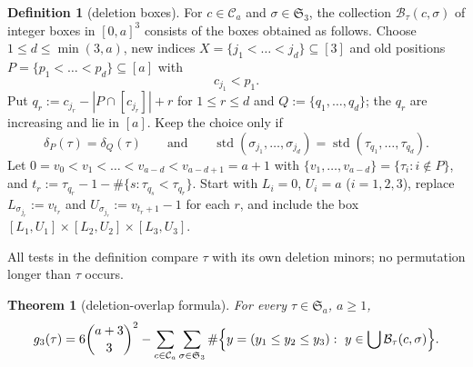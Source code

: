 \documentclass[11pt,reqno]{amsart}
\theoremstyle{plain}
\newtheorem{theorem}{Theorem}[section]
\theoremstyle{definition}
\newtheorem{definition}[definition]{Definition}
\theoremstyle{remark}
\newcommand{\std}{\operatorname{std}}
\newcommand{\Sym}{\mathfrak{S}}
\begin{document}
\begin{definition}[deletion boxes]\label{def:boxes}
For $c\in\mathcal C_a$ and $\sigma\in\Sym_3$, the collection $\mathcal B_\tau(c,\sigma)$ of integer boxes in $[0,a]^3$ consists of the boxes obtained as follows. Choose $1\le d\le\min(3,a)$, new indices $X=\{j_1<\dots<j_d\}\subseteq[3]$ and old positions $P=\{p_1<\dots<p_d\}\subseteq[a]$ with
\begin{equation}\label{eq:earlier}
c_{j_1}<p_1 .
\end{equation}
Put $q_r:=c_{j_r}-|P\cap[c_{j_r}]|+r$ for $1\le r\le d$ and $Q:=\{q_1,\dots,q_d\}$; the $q_r$ are increasing and lie in $[a]$. Keep the choice only if
\begin{equation}\label{eq:keep}
\delta_P(\tau)=\delta_Q(\tau)\qquad\text{and}\qquad \std(\sigma_{j_1},\dots,\sigma_{j_d})=\std(\tau_{q_1},\dots,\tau_{q_d}).
\end{equation}
Let $0=v_0<v_1<\dots<v_{a-d}<v_{a-d+1}=a+1$ with $\{v_1,\dots,v_{a-d}\}=\{\tau_i:i\notin P\}$, and $t_r:=\tau_{q_r}-1-\#\{s:\tau_{q_s}<\tau_{q_r}\}$. Start with $L_i=0$, $U_i=a$ ($i=1,2,3$), replace $L_{\sigma_{j_r}}:=v_{t_r}$ and $U_{\sigma_{j_r}}:=v_{t_r+1}-1$ for each $r$, and include the box $[L_1,U_1]\times[L_2,U_2]\times[L_3,U_3]$.
\end{definition}

All tests in the definition compare $\tau$ with its own deletion minors; no permutation longer than $\tau$ occurs.

\begin{theorem}[deletion-overlap formula]\label{thm:boxes}
For every $\tau\in\Sym_a$, $a\ge1$,
\begin{equation}\label{eq:boxes}
g_3(\tau)=6\binom{a+3}{3}^2-\sum_{c\in\mathcal C_a}\sum_{\sigma\in\Sym_3}\#\Bigl\{y=(y_1\le y_2\le y_3):\ y\in\bigcup\mathcal B_\tau(c,\sigma)\Bigr\}.
\end{equation}
\end{theorem}
\end{document}
